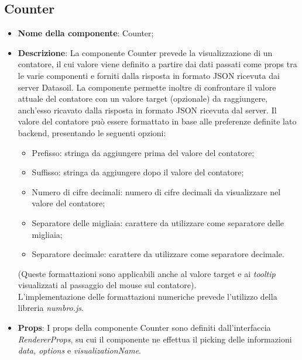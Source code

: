 \subsection{Counter}
\begin{itemize}
      \item \textbf{Nome della componente}: Counter;
      \item \textbf{Descrizione}: La componente Counter prevede la visualizzazione di un contatore, il cui valore viene definito a partire dai dati passati
            come props tra le varie componenti e forniti dalla risposta in formato JSON ricevuta dai server Datasoil. \newline
            La componente permette inoltre di confrontare il valore attuale del contatore con un valore target (opzionale) da raggiungere, anch'esso ricavato
            dalla risposta in formato JSON ricevuta dal server. \newline
            Il valore del contatore può essere formattato in base alle preferenze definite lato backend, presentando le seguenti opzioni:
            \begin{itemize}
                  \label{counter-format}
                  \item Prefisso: stringa da aggiungere prima del valore del contatore;
                  \item Suffisso: stringa da aggiungere dopo il valore del contatore;
                  \item Numero di cifre decimali: numero di cifre decimali da visualizzare nel valore del contatore;
                  \item Separatore delle migliaia: carattere da utilizzare come separatore delle migliaia;
                  \item Separatore decimale: carattere da utilizzare come separatore decimale.
            \end{itemize}
            (Queste formattazioni sono applicabili anche al valore target e ai \textit{tooltip} visualizzati al passaggio del mouse sul contatore).\\
            L'implementazione delle formattazioni numeriche prevede l'utilizzo della libreria \textit{numbro.js}.
      \item \textbf{Props}: I props della componente Counter sono definiti dall'interfaccia \textit{RendererProps}, su cui il componente ne effettua il picking
            delle informazioni \textit{data, options} e \textit{visualizationName}.
            \begin{listing}[H]

\end{listing}
\end{itemize}
